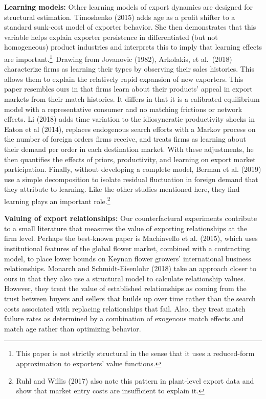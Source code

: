 \documentclass[12pt]{article}
\begin{document}
\textbf{Learning models:} Other learning models of export dynamics are
designed for structural estimation. Timoshenko (2015) adds age as a profit
shifter to a standard sunk-cost model of exporter behavior. She then
demonstrates that this variable helps explain exporter persistence in
differentiated (but not homogeneous) product industries and interprets this
to imply that learning effects are important.\footnote{%
This paper is not strictly structural in the sense that it uses a
reduced-form approximation to exporters' value functions.}\ Drawing from
Jovanovic (1982), Arkolakis, et al.\ (2018) characterize firms as learning
their types by observing their sales histories. This allows them to explain
the relatively rapid expansion of new exporters. This paper resembles ours
in that firms learn about their products' appeal in export markets from
their match histories. It differs in that it is a calibrated equilibrium
model with a representative consumer and no matching frictions or network
effects. Li (2018) adds time variation to the idiosyncratic productivity
shocks in Eaton et al (2014), replaces endogenous search efforts with a
Markov process on the number of foreign orders firms receive, and treats
firms as learning about their demand per order in each destination market.
With these adjustments, he then quantifies the effects of priors,
productivity, and learning on export market participation. Finally, without
developing a complete model, Berman et al. (2019) use a simple decomposition
to isolate residual fluctuation in foreign demand that they attribute to
learning. Like the other studies mentioned here, they find learning plays an
important role.\renewcommand{\baselinestretch}{1}\footnote{%
Ruhl and Willis (2017) also note this pattern in plant-level export data and
show that market entry costs are insufficient to explain it.}

\textbf{Valuing of export relationships:} Our counterfactural experiments contribute to a small literature that measures the value of exporting relationships at the firm level. Perhaps the best-known paper is Machiavello et al. (2015), which uses institutional features of the global flower market, combined with a contracting model, to place lower bounds on Keynan flower growers' international business relationships. Monarch and Schmidt-Eisenlohr (2018) take an approach closer to ours in that they also use a structural model to calculate relationship values. However, they treat the value of established relationships as coming from the trust between buyers and sellers that builds up over time rather than the search costs associated with replacing relationships that fail. Also, they treat match failure rates as determined by a combination of exogenous match effects and match age rather than optimizing behavior.
\end{document}
